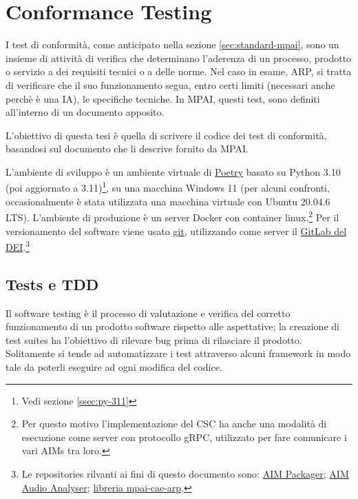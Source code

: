 
\chapter{Conformance Testing} \label{chp:conformancetesting}    %
I test di conformità, come anticipato nella sezione \ref{sec:standard-mpai}, sono un insieme di attività di verifica che determinano l'aderenza di un processo, prodotto o servizio a dei requisiti tecnici o a delle norme.
Nel caso in esame, \ac{ARP}, si tratta di verificare che il suo funzionamento segua, entro certi limiti (necessari anche perchè è una IA), le specifiche tecniche. In \ac{MPAI}, questi test, sono definiti all'interno di un documento apposito.

L'obiettivo di questa tesi è quella di scrivere il codice dei test di conformità, basandosi sul documento che li descrive fornito da MPAI.

L'ambiente di sviluppo è un ambiente virtuale di \href{https://python-poetry.org/}{Poetry} basato su Python 3.10 (poi aggiornato a 3.11)\footnote{Vedi sezione \ref{ssec:py-311}}, su una macchina Windows 11 (per alcuni confronti, occasionalmente è stata utilizzata una macchina virtuale con Ubuntu 20.04.6 LTS). L'ambiente di produzione è un server Docker con container linux.\footnote{Per questo motivo l'implementazione del CSC ha anche una modalità di esecuzione come server con protocollo gRPC, utilizzato per fare comunicare i vari \acp{AIM} tra loro.} Per il versionamento del software viene usato \href{https://git-scm.com/}{git}, utilizzando come server il \href{https://gitlab.dei.unipd.it/}{GitLab del \ac{DEI}}.\footnote{Le repositories rilvanti ai fini di questo documento sono: \href{https://gitlab.dei.unipd.it/mpai/packager}{\ac{AIM} Packager}; \href{https://gitlab.dei.unipd.it/mpai/audio-analyzer}{\ac{AIM} Audio Analyser}; \href{https://gitlab.dei.unipd.it/mpai/mpai-cae-arp}{libreria mpai-cae-arp}.}


\section{Tests e \acl{TDD}} \label{sec:tests-tdd}
Il software testing è il processo di valutazione e verifica del corretto funzionamento di un prodotto software rispetto alle aspettative; la creazione di test suites ha l'obiettivo di rilevare bug prima di rilasciare il prodotto.
Solitamente si tende ad automatizzare i test attraverso alcuni framework in modo tale da poterli eseguire ad ogni modifica del codice.

